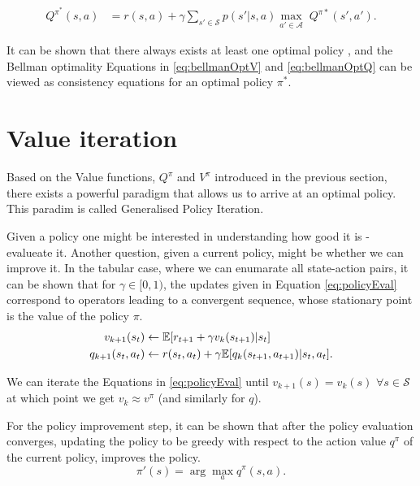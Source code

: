 \documentclass{report}
\numberwithin{equation}{section}
\numberwithin{figure}{section}
\numberwithin{table}{section}
\numberwithin{algorithm}{section}
\begin{document}
\begin{align}\label{eq:bellmanOptQ}
  Q^{\pi^*}(s,a)&=r(s,a) + \gamma \sum_{s'\in \mathcal{S}}p(s'|s, a)\max_{a'\in \mathcal{A}}\;Q^{\pi*}(s', a').
\end{align}

It can be shown that there always exists at least one optimal 
policy \citep{Sutton1998}, and the Bellman optimality Equations 
in \ref{eq:bellmanOptV} and \ref{eq:bellmanOptQ} can be viewed 
as consistency equations for an optimal policy $\pi^*$.

\section{Value iteration}\label{sec:ValueIter}
Based on the Value functions, $Q^{\pi}$ and $V^{\pi}$ introduced in the 
previous section, there exists a powerful paradigm that allows 
us to arrive at an optimal policy. This paradim is called Generalised 
Policy Iteration.

Given a policy one might be interested in understanding how good 
it is - evalueate it. Another question, given a current policy, 
might be whether we can improve it. In the tabular case, where 
we can enumarate all state-action pairs, it can be shown that 
for $\gamma\in[0, 1)$, the updates given in Equation 
\ref{eq:policyEval} correspond to operators 
leading to a convergent sequence, whose stationary point is the 
value of the policy $\pi$.
\begin{align}\label{eq:policyEval}
  v_{k+1}(s_t) &\gets \mathbb{E}[r_{t+1} + \gamma v_k(s_{t+1})|s_t]\notag\\
  q_{k+1}(s_t, a_t)&\gets r(s_t, a_t) 
  + \gamma\mathbb{E}[q_{k}(s_{t+1}, a_{t+1})|s_t,a_t].
\end{align}

We can iterate the Equations in \ref{eq:policyEval} until $v_{k+1}(s)=v_k(s)$ 
$\forall s\in \mathcal{S}$ at which point we get $v_k\approx v^{\pi}$ 
(and similarly for $q$).


For the policy improvement step, it can be shown \citep{Sutton1998} 
that after the 
policy evaluation converges, updating the policy 
to be greedy with respect to the action value $q^{\pi}$ of the 
current policy, improves the policy.
\begin{equation}\label{eq:policyImp}
  \pi'(s)=\arg \max_a q^{\pi}(s, a).
\end{equation}
\end{document}
